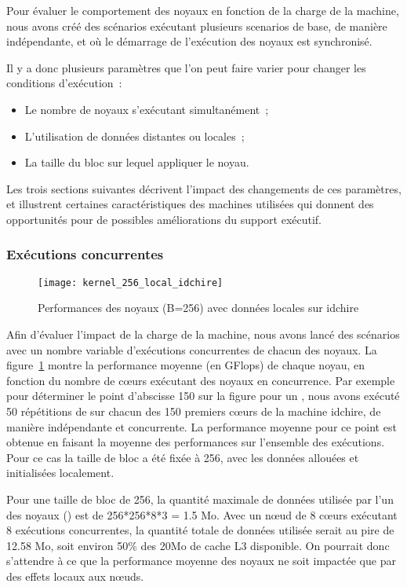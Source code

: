 Pour évaluer le comportement des noyaux en fonction de la charge de la machine, nous avons créé des scénarios exécutant plusieurs scenarios de base, de manière indépendante, et où le démarrage de l'exécution des noyaux est synchronisé.

Il y a donc plusieurs paramètres que l'on peut faire varier pour changer les conditions d'exécution~:
\begin{itemize}
  \item Le nombre de noyaux s'exécutant simultanément~;
  \item L'utilisation de données distantes ou locales~;
  \item La taille du bloc sur lequel appliquer le noyau.
\end{itemize}

Les trois sections suivantes décrivent l'impact des changements de ces paramètres, et illustrent certaines caractéristiques des machines utilisées qui donnent des opportunités pour de possibles améliorations du support exécutif.

\subsubsection{Exécutions concurrentes}

\begin{figure}[ht]
  \centering
  \texttt{[image: kernel\_256\_local\_idchire]}
  \caption{Performances des noyaux (B=256) avec données locales sur idchire}\label{fig:contribs:apps:cholesky:perf-256-local}
\end{figure}

Afin d'évaluer l'impact de la charge de la machine, nous avons lancé des scénarios avec un nombre variable d'exécutions concurrentes de chacun des noyaux. La figure~\ref{fig:contribs:apps:cholesky:perf-256-local} montre la performance moyenne (en GFlops) de chaque noyau, en fonction du nombre de cœurs exécutant des noyaux en concurrence.
Par exemple pour déterminer le point d'abscisse 150 sur la figure pour un \gemm, nous avons exécuté 50 répétitions de \gemm sur chacun des 150 premiers cœurs de la machine idchire, de manière indépendante et concurrente.
La performance moyenne pour ce point est obtenue en faisant la moyenne des performances sur l'ensemble des exécutions.
Pour ce cas la taille de bloc a été fixée à 256, avec les données allouées et initialisées localement.

Pour une taille de bloc de 256, la quantité maximale de données utilisée par l'un des noyaux (\gemm) est de 256*256*8*3 = 1.5 Mo. Avec un nœud de 8 cœurs exécutant 8 exécutions concurrentes, la quantité totale de données utilisée serait au pire de 12.58 Mo, soit environ 50\% des 20Mo de cache L3 disponible.
On pourrait donc s'attendre à ce que la performance moyenne des noyaux ne soit impactée que par des effets locaux aux nœuds.

